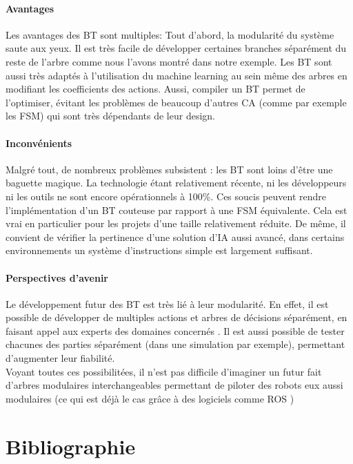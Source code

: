 \documentclass[titlepage]{article}
\begin{document}
	\paragraph{Avantages} Les avantages des BT sont multiples: Tout d'abord, la modularité du système saute aux yeux. \cite{colledanchise_2017} Il est très facile de développer certaines branches séparément du reste de l'arbre comme nous l'avons montré dans notre exemple.
	Les BT sont aussi très adaptés à l'utilisation du machine learning au sein même des arbres en modifiant les coefficients des actions. \cite{Fu2016/08}
	Aussi, compiler un BT permet de l'optimiser, évitant les problèmes de beaucoup d'autres CA (comme par exemple les FSM) qui sont très dépendants de leur design. \cite{colledanchise_2017}
	\paragraph{Inconvénients} Malgré tout, de nombreux problèmes subsistent : les BT sont loins d'\^etre une baguette magique. La technologie étant relativement récente, ni les développeurs ni les outils ne sont encore opérationnels à 100\%. Ces soucis peuvent rendre l'implémentation d'un BT couteuse par rapport à une FSM équivalente. \cite{colledanchise_2017} Cela est vrai en particulier pour les projets d'une taille relativement réduite. 
	De même, il convient de vérifier la pertinence d'une solution d'IA aussi avancé, dans certains environnements un système d'instructions simple est largement suffisant.
	\paragraph{Perspectives d'avenir} Le développement futur des BT est très lié à leur modularité. En effet, il est possible de développer de multiples actions et arbres de décisions séparément, en faisant appel aux experts des domaines concernés \cite{colledanchise_2017}. Il est aussi possible de tester chacunes des parties séparément (dans une simulation par exemple), permettant d'augmenter leur fiabilité. 
	\\
	Voyant toutes ces possibilitées, il n'est pas difficile d'imaginer un futur fait d'arbres modulaires interchangeables permettant de piloter des robots eux aussi modulaires (ce qui est déjà le cas grâce à des logiciels comme ROS \cite{ros.org})
	\clearpage
	\section{Bibliographie}
	
	
\end{document}
